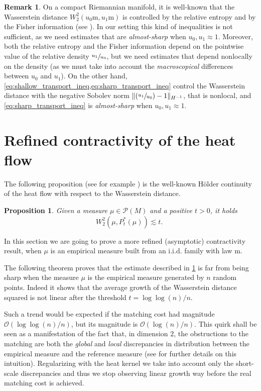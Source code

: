 \documentclass[10pt]{amsart}
\newcommand{\Psfrac}[2]{(\sfrac{#1}{#2})}
\theoremstyle{plain}
\newtheorem{proposition}[proposition]{Proposition}
\theoremstyle{definition}
\newtheorem{remark}[remark]{Remark}
\numberwithin{equation}{section}
\newcommand{\bigo}{\ensuremath{\mathcal{O}}}
\newcommand{\prob}{\ensuremath{\mathcal{P}}}
\newcommand{\fullstop}{\ensuremath{\text{. }}}
\newcommand{\m}{\ensuremath{\mathrm m}}
\DeclarePairedDelimiter\norm{\lVert}{\rVert}
\begin{document}
\begin{remark}
On a compact Riemannian manifold, it is well-known that the Wasserstein distance $W_2^2(u_0\m, u_1\m)$ is controlled by the relative entropy and by the Fisher information (see \cite{Otto-Villani00}). In our setting this kind of inequalities is not sufficient, as we need estimates that are \emph{almost-sharp} when $u_0, u_1\approx 1$. Moreover, both the relative entropy and the Fisher information depend on the pointwise value of the relative density $\sfrac{u_1}{u_0}$, but we need estimates that depend nonlocally on the density (as we must take into account the \emph{macroscopical} differences between $u_0$ and $u_1$). On the other hand, \cref{eq:shallow_transport_ineq,eq:sharp_transport_ineq} control the Wasserstein distance with the negative Sobolev norm $\norm{\Psfrac{u_1}{u_0}-1}_{H^{-1}}$, that is nonlocal, and \cref{eq:sharp_transport_ineq} is \emph{almost-sharp} when $u_0,u_1\approx 1$.
\end{remark}

\section{Refined contractivity of the heat flow}\label{sec:extreme_contractivity}
The following proposition (see for example \cite[Th.\,3]{ErbarKuwadaSturm2015}) is the well-known Hölder continuity of the heat flow with respect
to the Wasserstein distance.
\begin{proposition}\label{prop:heat_holder}
Given a measure $\mu\in \prob(M)$ and a positive $t>0$, it holds
\begin{equation*}
W_2^2(\mu, P_t^*(\mu)) \lesssim t \fullstop
\end{equation*}
\end{proposition}
In this section we are going to prove a more refined (asymptotic) contractivity result, when $\mu$ is
an empirical measure built from an i.i.d. family with law $\m$.

The following theorem proves that the estimate described in
\cref{prop:heat_holder} is far from being sharp when the measure $\mu$ is the empirical measure
generated by $n$ random points. Indeed it shows that the average growth of the Wasserstein distance squared
is not linear after the threshold $t = \log\log(n)/n$.

Such a trend would be expected if the matching cost had magnitude $\bigo(\log\log(n)/n)$, but its magnitude is
$\bigo(\log(n)/n)$. This quirk shall be seen as a manifestation of the fact that, in dimension $2$, the
obstructions to the matching are both the \emph{global} and \emph{local} discrepancies in distribution
between the empirical measure and the reference measure (see \cite[\S4.2]{Talagrand14} for further
details on this intuition). Regularizing with the heat kernel we take into account only
the short-scale discrepancies and thus we stop observing linear growth way before the real matching cost is
achieved.
\end{document}
